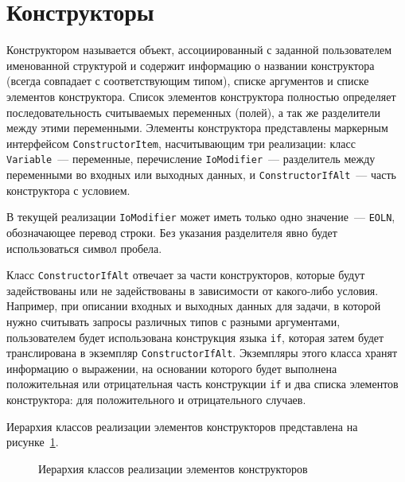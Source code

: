 \documentclass[times,specification,annotation]{style/itmo-student-thesis/itmo-student-thesis}
\begin{document}
\section{Конструкторы}

Конструктором называется объект, ассоциированный с заданной пользователем именованной структурой и содержит информацию о названии конструктора (всегда совпадает с соответствующим типом), списке аргументов и списке элементов конструктора. Список элементов конструктора полностью определяет последовательность считываемых переменных (полей), а так же разделители между этими переменными. Элементы конструктора представлены маркерным интерфейсом \texttt{ConstructorItem}, насчитывающим три реализации: класс \texttt{Variable}~--- переменные, перечисление \texttt{IoModifier}~--- разделитель между переменными во входных или выходных данных, и \texttt{ConstructorIfAlt}~--- часть конструктора с условием.

В текущей реализации \texttt{IoModifier} может иметь только одно значение~--- \texttt{EOLN}, обозначающее перевод строки. Без указания разделителя явно будет использоваться символ пробела.

Класс \texttt{ConstructorIfAlt} отвечает за части конструкторов, которые будут задействованы или не задействованы в зависимости от какого-либо условия. Например, при описании входных и выходных данных для задачи, в которой нужно считывать запросы различных типов с разными аргументами, пользователем будет использована конструкция языка \texttt{if}, которая затем будет транслирована в экземпляр \texttt{ConstructorIfAlt}. Экземпляры этого класса хранят информацию о выражении, на основании которого будет выполнена положительная или отрицательная часть конструкции \texttt{if} и два списка элементов конструктора: для положительного и отрицательного случаев.

Иерархия классов реализации элементов конструкторов представлена на рисунке~\ref{constructor-items-classes-hierarchy}.

\begin{figure}[!h]
\caption{Иерархия классов реализации элементов конструкторов}\label{constructor-items-classes-hierarchy}
\centering
{}
\end{figure}
\end{document}
